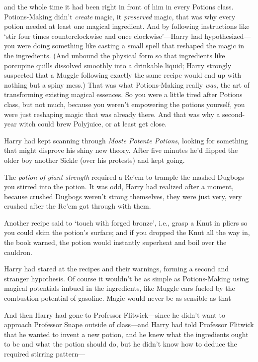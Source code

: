 {\el} and the whole time it had been right in front of him in every Potions
class. Potions-Making didn't \emph{create} magic, it \emph{preserved} magic,
that was why every potion needed at least one magical ingredient. And by
following instructions like `stir four times counterclockwise and once
clockwise'---Harry had hypothesized---you were doing something like casting a
small spell that reshaped the magic in the ingredients. (And unbound the
physical form so that ingredients like porcupine quills dissolved smoothly into
a drinkable liquid; Harry strongly suspected that a Muggle following exactly
the same recipe would end up with nothing but a spiny mess.) That was what
Potions-Making really \emph{was,} the art of transforming existing magical
essences. So you were a little tired after Potions class, but not much, because
you weren't empowering the potions yourself, you were just reshaping magic that
was already there. And that was why a second-year witch could brew Polyjuice,
or at least get close.

Harry had kept scanning through \emph{Moste Potente Potions,} looking for
something that might disprove his shiny new theory. After five minutes he'd
flipped the older boy another Sickle (over his protests) and kept going.

The \emph{potion of giant strength} required a Re'em to trample the mashed
Dugbogs you stirred into the potion. It was odd, Harry had realized after a
moment, because crushed Dugbogs weren't strong themselves, they were
just{\el} very, very crushed after the Re'em got through with them.

Another recipe said to `touch with forged bronze', i.e., grasp a Knut in pliers
so you could skim the potion's surface; and if you dropped the Knut all the way
in, the book warned, the potion would instantly superheat and boil over the
cauldron.

Harry had stared at the recipes and their warnings, forming a second and
stranger hypothesis. Of course it wouldn't be as simple as Potions-Making using
magical potentials imbued in the ingredients, like Muggle cars fueled by the
combustion potential of gasoline. Magic would never be as sensible as
that{\el}

And then Harry had gone to Professor Flitwick---since he didn't want to
approach Professor Snape outside of class---and Harry had told Professor
Flitwick that he wanted to invent a new potion, and he knew what the
ingredients ought to be and what the potion should do, but he didn't know how
to deduce the required stirring pattern---

